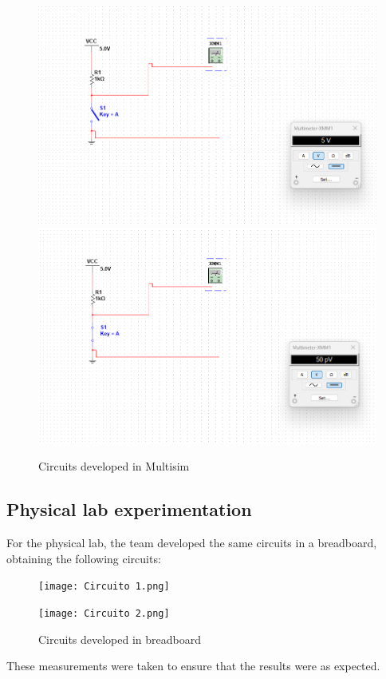 \documentclass[12pt]{article}  %
\begin{document}
\begin{figure}[H]
    \centering
    \includegraphics[scale=0.3]{Prueba1.png}
    \hfill
    \includegraphics[scale=0.3]{Prueba2.png}
    \caption{Circuits developed in Multisim}
    \label{fig:multisim_circuits_measurements}
\end{figure}
\subsection{Physical lab experimentation}
For the physical lab, the team developed the same circuits in a breadboard, obtaining the following circuits:
\begin{figure}[H]
  \centering
  \begin{minipage}{0.25\textwidth}
    \centering
    \texttt{[image: Circuito 1.png]}
  \end{minipage}
  \hspace{0.05\textwidth}
  \begin{minipage}{0.25\textwidth}
    \centering
    \texttt{[image: Circuito 2.png]}
  \end{minipage}
  \caption{Circuits developed in breadboard}
  \label{fig:breadboard_circuits}
\end{figure}
These measurements were taken to ensure that the results were as expected.
\end{document}
